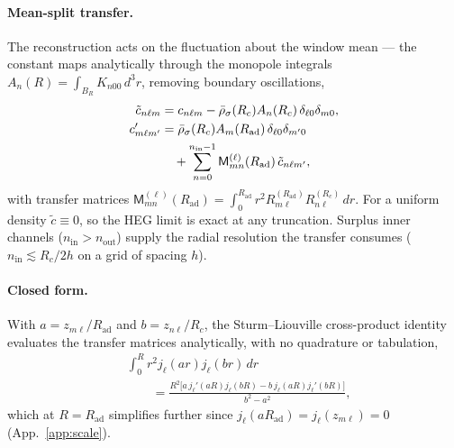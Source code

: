 \documentclass[aps,prb,reprint,superscriptaddress,nofootinbib]{revtex4-2}
\newcommand{\Rad}{R_{\mathrm{ad}}}
\newcommand{\Rc}{R_{c}}
\newcommand{\nin}{n_{\mathrm{in}}}
\newcommand{\nout}{n_{\mathrm{out}}}
\begin{document}
\paragraph*{Mean-split transfer.}
The reconstruction acts on the fluctuation about the window mean --- the constant
maps analytically through the monopole integrals $A_n(R)=\int_{B_R}K_{n00}\,d^3r$,
removing boundary oscillations,
\begin{align}
\label{eq:meansplit}
\tilde c_{n\ell m}&=c_{n\ell m}-\bar\rho_\sigma(\Rc)A_n(\Rc)\,\delta_{\ell0}\delta_{m0},\\
\label{eq:transfer}
c'_{m\ell m'}&=\bar\rho_\sigma(\Rc)A_m(\Rad)\,\delta_{\ell0}\delta_{m'0}\notag\\
&\quad+\sum_{n=0}^{\nin-1}\mathsf M^{(\ell)}_{mn}(\Rad)\,\tilde c_{n\ell m'} ,
\end{align}
with transfer matrices $\mathsf M^{(\ell)}_{mn}(\Rad)=\int_0^{\Rad}r^2
R^{(\Rad)}_{m\ell}R^{(\Rc)}_{n\ell}\,dr$. For a uniform density $\tilde c\equiv0$,
so the HEG limit is exact at any truncation. Surplus inner channels
($\nin>\nout$) supply the radial resolution the transfer consumes
($\nin\lesssim\Rc/2h$ on a grid of spacing $h$).

\paragraph*{Closed form.}
With $a=z_{m\ell}/\Rad$ and $b=z_{n\ell}/\Rc$, the Sturm--Liouville cross-product
identity evaluates the transfer matrices analytically, with no quadrature or
tabulation,
\begin{equation}
\label{eq:transfer-closed}
\begin{aligned}
&\int_0^{R} r^2 j_\ell(ar)j_\ell(br)\,dr\\
&\qquad=\frac{R^2\bigl[a\,j_\ell'(aR)j_\ell(bR)-b\,j_\ell(aR)j_\ell'(bR)\bigr]}{b^2-a^2},
\end{aligned}
\end{equation}
which at $R=\Rad$ simplifies further since $j_\ell(a\Rad)=j_\ell(z_{m\ell})=0$
(App.~\ref{app:scale}).
\end{document}
